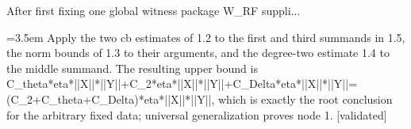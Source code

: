 \documentclass{article}
\newcommand{\step}[1]{\par\noindent\hangindent=3.5em\hangafter=1%
  \makebox[3.5em][l]{\textbf{#1.}}}
\newcommand{\steptag}[1]{\hfill{\small\textsf{[#1]}}}
\begin{document}
\begin{proofbox}{After first fixing one global witness package W\_RF suppli...}
\step{1.6} Apply the two cb estimates of 1.2 to the first and third summands in 1.5, the norm bounds of 1.3 to their arguments, and the degree-two estimate 1.4 to the middle summand. The resulting upper bound is C\_theta*eta*||X||*||Y||+C\_2*eta*||X||*||Y||+C\_Delta*eta*||X||*||Y||=(C\_2+C\_theta+C\_Delta)*eta*||X||*||Y||, which is exactly the root conclusion for the arbitrary fixed data; universal generalization proves node 1. \steptag{validated} \\[4pt]
\end{proofbox}
\end{document}
